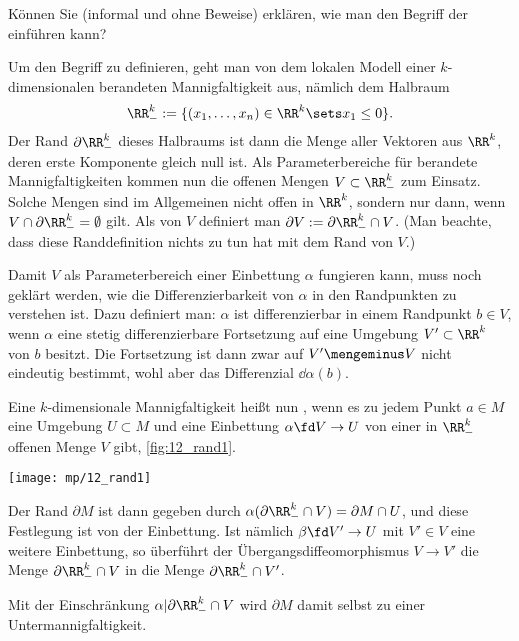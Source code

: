 \begin{frage}
  Können Sie (informal und ohne Beweise) erklären, 
  wie man den Begriff der  
  einführen kann? 
\end{frage}

\begin{antwort}
  Um den Begriff zu definieren, geht man von dem lokalen Modell 
  einer $k$-dimensionalen berandeten Mannigfaltigkeit aus, nämlich 
  dem Halbraum   
  \[
  \RR^k_- := \{ (x_1, \ldots, x_n ) \in \RR^k \sets x_1 \le 0 \}. 
  \]
  Der Rand $\partial \RR^k_-$ dieses Halbraums ist dann die Menge 
  aller Vektoren aus $\RR^k$, deren erste Komponente gleich null ist. 
  Als Parameterbereiche für berandete Mannigfaltigkeiten kommen nun 
  die offenen Mengen $V \subset \RR^k_-$ zum Einsatz. 
  Solche Mengen sind im Allgemeinen nicht offen in $\RR^k$, sondern 
  nur dann, wenn $V \cap \partial \RR^k_- = \emptyset$ gilt. 
  Als  von $V$ definiert man 
  $\partial V := \partial\RR^k_- \cap V$. (Man beachte, dass diese 
  Randdefinition  nichts zu tun hat mit dem  
  Rand von $V$.)  

  Damit $V$ als Parameterbereich einer Einbettung 
  $\alpha$ fungieren kann, muss noch geklärt werden, wie die 
  Differenzierbarkeit von $\alpha$ in den Randpunkten zu verstehen ist. 
  Dazu definiert man: $\alpha$ ist 
  differenzierbar in einem Randpunkt $b\in V$, wenn $\alpha$ 
  eine stetig differenzierbare Fortsetzung auf eine Umgebung 
  $V' \subset \RR^k$ von $b$ besitzt. 
  Die Fortsetzung ist dann zwar auf $V'\mengeminus V$ 
  nicht eindeutig bestimmt, wohl aber das Differenzial $\dd \alpha( b )$.  

  Eine $k$-dimensionale Mannigfaltigkeit heißt nun , 
  wenn es zu jedem Punkt $a\in M$ eine Umgebung $U\subset M$ 
  und eine Einbettung $\alpha \fd V \to U$ von einer in 
  $\RR^k_-$ offenen Menge $V$ gibt, \sieheAbbildung\ref{fig:12_rand1}. 
  
  \begin{center}
    \texttt{[image: mp/12\_rand1]}
    \label{fig:12_rand1}
  \end{center}
  
  Der Rand $\partial M$ ist 
  dann gegeben durch  $
  \alpha( \partial \RR^k_- \cap V ) = \partial M \cap U$, 
  und diese Festlegung ist  von der Einbettung. 
  Ist nämlich $\beta \fd V' \to U$ mit $V' \in V$ eine weitere 
  Einbettung, so überführt der Übergangsdiffeomorphismus 
  $V \to V'$ die Menge $\partial \RR^k_- \cap V$ in die Menge
  $\partial \RR^k_- \cap V'$.  

  Mit der Einschränkung $\alpha | \partial \RR^k_- \cap V$ wird 
  $\partial M$ damit selbst zu einer Untermannigfaltigkeit. \AntEnd
\end{antwort}

